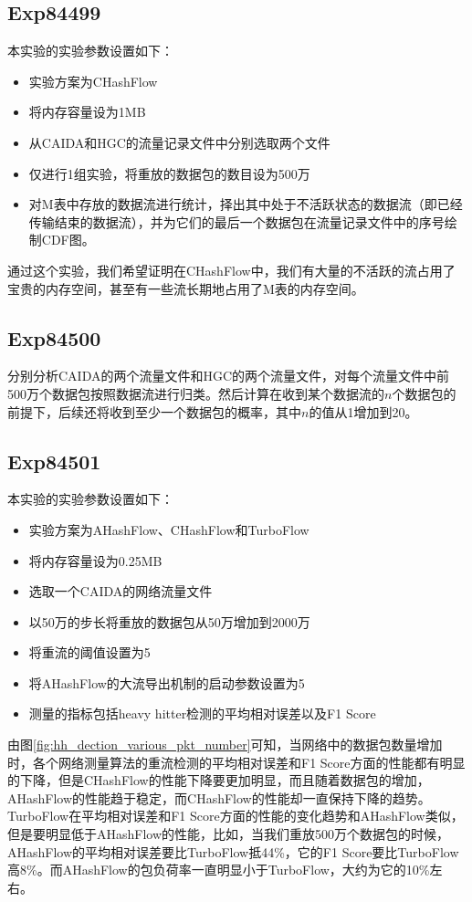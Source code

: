 \documentclass{article}
\begin{document}
\subsection{Exp84499}
本实验的实验参数设置如下：
\begin{itemize}
	\item 实验方案为CHashFlow
	\item 将内存容量设为1MB
	\item 从CAIDA和HGC的流量记录文件中分别选取两个文件
	\item 仅进行1组实验，将重放的数据包的数目设为500万
	\item 对M表中存放的数据流进行统计，择出其中处于不活跃状态的数据流（即已经传输结束的数据流），并为它们的最后一个数据包在流量记录文件中的序号绘制CDF图。
\end{itemize}
通过这个实验，我们希望证明在CHashFlow中，我们有大量的不活跃的流占用了宝贵的内存空间，甚至有一些流长期地占用了M表的内存空间。

\subsection{Exp84500}
分别分析CAIDA的两个流量文件和HGC的两个流量文件，对每个流量文件中前500万个数据包按照数据流进行归类。然后计算在收到某个数据流的$n$个数据包的前提下，后续还将收到至少一个数据包的概率，其中$n$的值从1增加到20。

\subsection{Exp84501}
本实验的实验参数设置如下：
\begin{itemize}
	\item 实验方案为AHashFlow、CHashFlow和TurboFlow
	\item 将内存容量设为0.25MB
	\item 选取一个CAIDA的网络流量文件
	\item 以50万的步长将重放的数据包从50万增加到2000万
	\item 将重流的阈值设置为5
	\item 将AHashFlow的大流导出机制的启动参数设置为5
	\item 测量的指标包括heavy hitter检测的平均相对误差以及F1 Score
\end{itemize}

由图\ref{fig:hh_dection_various_pkt_number}可知，当网络中的数据包数量增加时，各个网络测量算法的重流检测的平均相对误差和F1 Score方面的性能都有明显的下降，但是CHashFlow的性能下降要更加明显，而且随着数据包的增加，AHashFlow的性能趋于稳定，而CHashFlow的性能却一直保持下降的趋势。TurboFlow在平均相对误差和F1 Score方面的性能的变化趋势和AHashFlow类似，但是要明显低于AHashFlow的性能，比如，当我们重放500万个数据包的时候，AHashFlow的平均相对误差要比TurboFlow抵44\%，它的F1 Score要比TurboFlow高8\%。而AHashFlow的包负荷率一直明显小于TurboFlow，大约为它的10\%左右。
\end{document}
